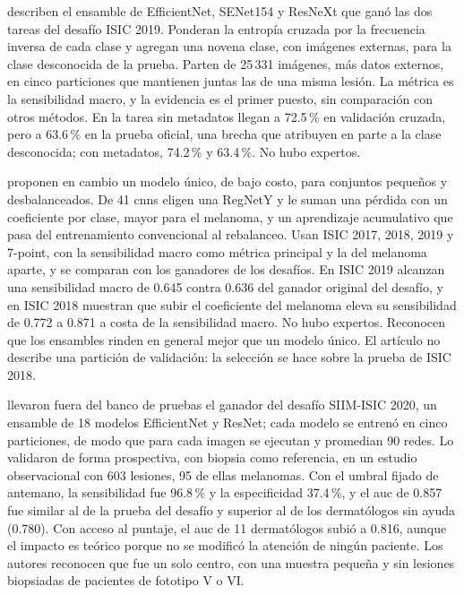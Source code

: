 \textcite{gessert2020skin} describen el ensamble de EfficientNet, SENet154 y ResNeXt que ganó las dos tareas del
desafío ISIC 2019. Ponderan la entropía cruzada por la frecuencia inversa de cada clase y agregan una novena clase,
con imágenes externas, para la clase desconocida de la prueba. Parten de 25\,331 imágenes, más datos externos, en cinco
particiones que mantienen juntas las de una misma lesión. La métrica es la sensibilidad macro, y la evidencia es el primer puesto, sin
comparación con otros métodos. En la tarea sin metadatos llegan a 72.5\,\% en validación cruzada, pero a 63.6\,\% en la
prueba oficial, una brecha que atribuyen en parte a la clase desconocida; con metadatos, 74.2\,\% y 63.4\,\%. No hubo expertos.

\textcite{yao2022single} proponen en cambio un modelo único, de bajo costo, para conjuntos pequeños y
desbalanceados. De 41 \glspl{cnn} eligen una RegNetY y le suman una pérdida con un coeficiente por clase, mayor para
el melanoma, y un aprendizaje acumulativo que pasa del entrenamiento convencional al rebalanceo. Usan ISIC 2017, 2018,
2019 y 7-point, con la sensibilidad macro como métrica principal y la del melanoma aparte, y se comparan con los
ganadores de los desafíos. En ISIC 2019 alcanzan una sensibilidad macro de 0.645 contra 0.636 del ganador original del
desafío, y en ISIC 2018 muestran que subir el coeficiente del melanoma eleva su sensibilidad de 0.772 a 0.871 a
costa de la sensibilidad macro. No
hubo expertos. Reconocen que los ensambles rinden en general mejor que un modelo único. El artículo no describe una
partición de validación: la selección se hace sobre la prueba de ISIC 2018.

\textcite{marchetti2023prospective} llevaron fuera del banco de pruebas el ganador del desafío SIIM-ISIC 2020,
un ensamble de 18 modelos EfficientNet y ResNet; cada modelo se entrenó en cinco
particiones, de modo que para cada imagen se ejecutan y promedian 90 redes. Lo validaron de forma
prospectiva, con biopsia como referencia, en un estudio observacional con 603 lesiones, 95 de ellas melanomas. Con
el umbral fijado de antemano, la sensibilidad fue 96.8\,\% y la especificidad 37.4\,\%, y el \gls{auc} de 0.857 fue
similar al de la prueba del desafío y superior al de los dermatólogos sin ayuda (0.780). Con acceso al puntaje, el
\gls{auc} de 11 dermatólogos subió a 0.816, aunque el impacto es teórico porque no se modificó la atención de ningún
paciente. Los autores reconocen que fue un solo centro, con una muestra pequeña y sin lesiones biopsiadas de pacientes de
fototipo V o VI.

